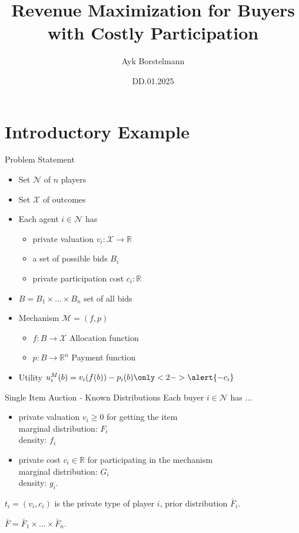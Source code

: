 \documentclass{beamer}
\title{Revenue Maximization for Buyers with Costly Participation}
\date{DD.01.2025}
\author{Ayk Borstelmann}
\institute{
    Seminar Algorithmic Game Theory
}
\begin{document}
\maketitle
\section{Introductory Example}
\begin{frame}{Problem Statement}
  \begin{itemize}
    \item Set $\mathcal{N}$ of $n$ players
    \item Set $\mathcal{X}$ of outcomes
    \item Each agent $i \in \mathcal{N}$ has
          \begin{itemize}
            \item private valuation $v_i: \mathcal{X} \rightarrow \mathbb{R}$
            \item a set of possible bids $B_i$
            \item<2-> \alert{private participation cost $c_i: \mathbb{R}$}
          \end{itemize}
    \item $B = B_1 \times \dots \times B_n$ set of all bids
    \item Mechanism $\mathcal{M} = (f,p)$
          \begin{itemize}
            \item $f: B \rightarrow \mathcal{X}$ Allocation function
            \item $p: B \rightarrow \mathbb{R}^n$ Payment function
          \end{itemize}
    \item Utility $u_i^M(b) = v_i(f(b)) - p_i(b) \only<2->{\alert{-c_i}}$
  \end{itemize}
\end{frame}
\begin{frame}{Single Item Auction - Known Distributions}
  Each buyer $i \in \mathcal{N}$ has ...
  \begin{itemize}
    \item private valuation $v_i \geq 0$ for getting the item\\
          marginal distribution: $F_i$\\
          density: $f_i$
    \item private cost $c_i \in \mathbb{R}$ for participating in the mechanism \\
          marginal distribution: $G_i$ \\
          density: $g_i$.
  \end{itemize}
  $t_i = (v_i, c_i)$ is the private type of player $i$, prior distribution $\bar{F}_i$.

  $\bar{F} = \bar{F}_1 \times \dots \times \bar{F}_n$.
\end{frame}
\end{document}
